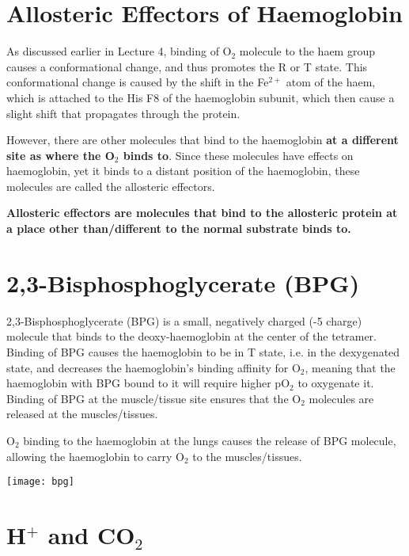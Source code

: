 \section{Allosteric Effectors of Haemoglobin}

As discussed earlier in Lecture 4, binding of O$_2$ molecule to the haem group causes a conformational change, and thus promotes the R or T state.
This conformational change is caused by the shift in the Fe$^{2+}$ atom of the haem, which is attached to the His F8 of the haemoglobin subunit, which then cause a slight shift that propagates through the protein.

However, there are other molecules that bind to the haemoglobin \textbf{at a different site as where the O$_2$ binds to}.
Since these molecules have effects on haemoglobin, yet it binds to a distant position of the haemoglobin, these molecules are called the allosteric effectors.

\vspace{0.3cm}

\begin{center}
\textbf{Allosteric effectors are molecules that bind to the allosteric protein at a place other than/different to the normal substrate binds to.}
\end{center}

\section{2,3-Bisphosphoglycerate (BPG)}

2,3-Bisphosphoglycerate (BPG) is a small, negatively charged (-5 charge) molecule that binds to the deoxy-haemoglobin at the center of the tetramer.
Binding of BPG causes the haemoglobin to be in T state, i.e. in the dexygenated state, and decreases the haemoglobin's binding affinity for O$_2$, meaning that the haemoglobin with BPG bound to it will require higher pO$_2$ to oxygenate it.
Binding of BPG at the muscle/tissue site ensures that the O$_2$ molecules are released at the muscles/tissues.

O$_2$ binding to the haemoglobin at the lungs causes the release of BPG molecule, allowing the haemoglobin to carry O$_2$ to the muscles/tissues.

\begin{center}
\texttt{[image: bpg]}
\end{center}

\section{H$^+$ and CO$_2$}

